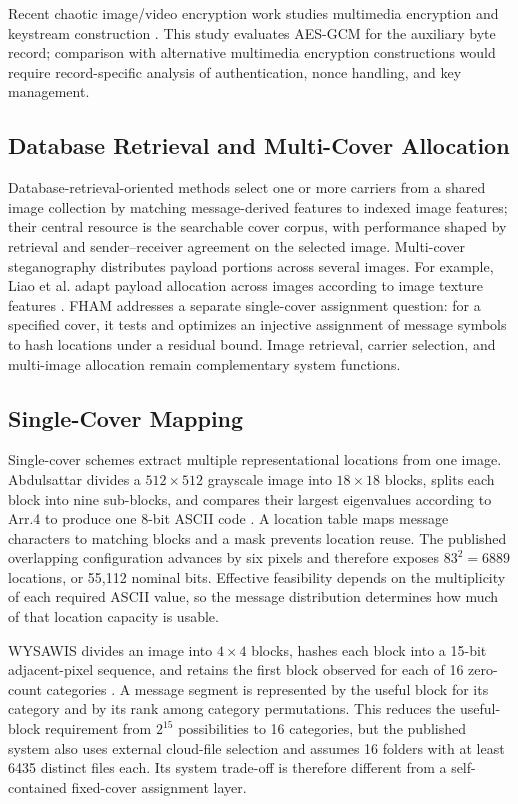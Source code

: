 \documentclass[preprint,12pt]{elsarticle}
\theoremstyle{plain}
\begin{document}
Recent chaotic
image/video encryption work studies multimedia encryption and keystream
construction \cite{gao2025memristive,gao2025story,gao2025chaosreview}.
This study evaluates AES-GCM for the auxiliary byte record; comparison with
alternative multimedia encryption constructions would require record-specific
analysis of authentication, nonce handling, and key management.

\subsection{Database Retrieval and Multi-Cover Allocation}
Database-retrieval-oriented methods select one or more carriers from a shared
image collection by matching message-derived features to indexed image
features; their central resource is the searchable cover corpus, with
performance shaped by retrieval and sender--receiver agreement on the selected
image. Multi-cover steganography distributes payload portions across several
images. For example, Liao et al. adapt payload allocation across images
according to image texture features \cite{liao2022adaptivepayload}. FHAM
addresses a separate single-cover assignment question: for a specified cover,
it tests and optimizes an injective assignment of message symbols to hash
locations under a residual bound. Image retrieval, carrier selection, and
multi-image allocation remain complementary system functions.

\subsection{Single-Cover Mapping}
Single-cover schemes extract multiple representational locations from one image. Abdulsattar divides a $512\times512$ grayscale image into $18\times18$ blocks, splits each block into nine sub-blocks, and compares their largest eigenvalues according to Arr.4 to produce one 8-bit ASCII code \cite{abdulsattar2021}. A location table maps message characters to matching blocks and a mask prevents location reuse. The published overlapping configuration advances by six pixels and therefore exposes $83^2=6889$ locations, or 55,112 nominal bits. Effective feasibility depends on the multiplicity of each required ASCII value, so the message distribution determines how much of that location capacity is usable.

WYSAWIS divides an image into $4\times4$ blocks, hashes each block into a 15-bit adjacent-pixel sequence, and retains the first block observed for each of 16 zero-count categories \cite{wysawis2024}. A message segment is represented by the useful block for its category and by its rank among category permutations. This reduces the useful-block requirement from $2^{15}$ possibilities to 16 categories, but the published system also uses external cloud-file selection and assumes 16 folders with at least 6435 distinct files each. Its system trade-off is therefore different from a self-contained fixed-cover assignment layer.
\end{document}
